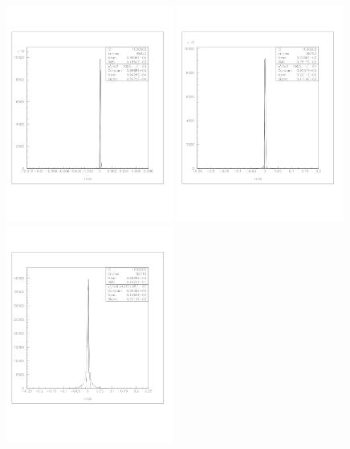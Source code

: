\documentclass[a4paper]{article}
\begin{document}
\begin{figure}[!htb]
  \centering
  \includegraphics[width=0.49\textwidth]{ex_images/1_020_010_xs.jpg}
  \includegraphics[width=0.49\textwidth]{ex_images/1_020_030_xs.jpg}
  \includegraphics[width=0.49\textwidth]{ex_images/1_020_050_xs.jpg}

\end{figure}
\end{document}
